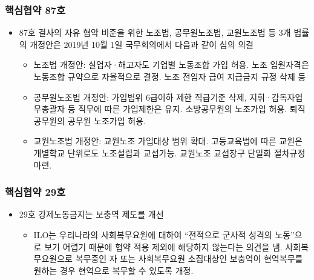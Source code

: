 \documentclass[aspectratio=169,xcolor=dvipsnames,handout]{beamer}
\begin{document}
\begin{frame}
    \frametitle{핵심협약 87호}
    \begin{itemize}[<+->]
        \item 87호 결사의 자유 협약 비준을 위한 노조법, 공무원노조법, 교원노조법 등 3개 법률의 개정안은 2019년 10월 1일 국무회의에서 다음과 같이 심의 의결
        \begin{itemize}
                \item 노조법 개정안: 실업자·해고자도 기업별 노동조합 가입 허용. 노조 임원자격은 노동조합 규약으로 자율적으로 결정. 노조 전임자 급여 지급금지 규정 삭제 등
                \item 공무원노조법 개정안: 가입범위 6급이하 제한 직급기준 삭제, 지휘·감독자업무총괄자 등 직무에 따른 가입제한은 유지. 소방공무원의 노조가입 허용. 퇴직 공무원의 공무원 노조가입 허용.
            \item 교원노조법 개정안: 교원노조 가입대상 범위 확대. 고등교육법에 따른 교원은 개별학교 단위로도 노조설립과 교섭가능. 교원노조 교섭창구 단일화 절차규정 마련.
        \end{itemize}
    \end{itemize}
\end{frame}

\begin{frame}
    \frametitle{핵심협약 29호}
    \begin{itemize}[<+->]
        \item 29호 강제노동금지는 보충역 제도를 개선
        \begin{itemize}
            \item ILO는 우리나라의 사회복무요원에 대하여 “전적으로 군사적 성격의 노동”으로 보기 어렵기 때문에 협약 적용 제외에 해당하지 않는다는 의견을 냄. 사회복무요원으로 복무중인 자 또는 사회복무요원 소집대상인 보충역이 현역복무를 원하는 경우 현역으로 복무할 수 있도록 개정.
        \end{itemize}
    \end{itemize}
\end{frame}
\end{document}

